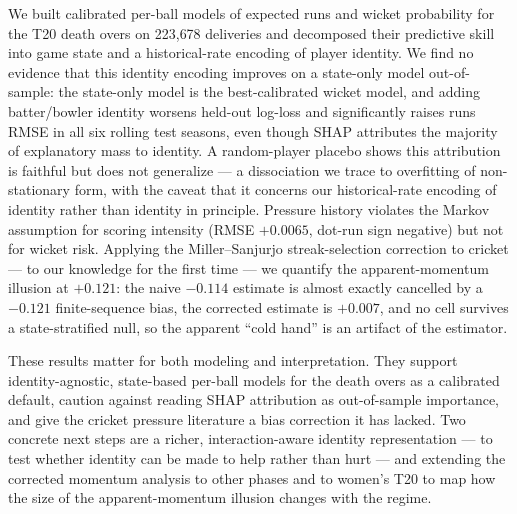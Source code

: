 We built calibrated per-ball models of expected runs and wicket probability for
the T20 death overs on 223{,}678 deliveries and decomposed their predictive skill
into game state and a historical-rate encoding of player identity. We find no
evidence that this identity encoding improves on a state-only model out-of-sample:
the state-only model is the best-calibrated wicket
model, and adding batter/bowler identity worsens held-out log-loss and significantly
raises runs RMSE in all six rolling test seasons, even though SHAP attributes the
majority of explanatory mass to identity. A random-player placebo shows this
attribution is faithful but does not generalize --- a dissociation we trace to
overfitting of non-stationary form, with the caveat that it concerns our
historical-rate encoding of identity rather than identity in principle. Pressure
history violates the Markov assumption for scoring intensity (RMSE $+0.0065$,
dot-run sign negative) but not for wicket risk. Applying the Miller--Sanjurjo
streak-selection correction to cricket --- to our knowledge for the first time ---
we quantify the apparent-momentum illusion at $+0.121$: the naive $-0.114$ estimate
is almost exactly cancelled by a $-0.121$ finite-sequence bias, the corrected
estimate is $+0.007$, and no cell survives a state-stratified null, so the apparent
``cold hand'' is an artifact of the estimator.

These results matter for both modeling and interpretation. They support
identity-agnostic, state-based per-ball models for the death overs as a calibrated
default, caution against reading SHAP attribution as out-of-sample importance, and
give the cricket pressure literature a bias correction it has lacked. Two concrete
next steps are a richer, interaction-aware identity representation --- to test
whether identity can be made to help rather than hurt --- and extending the
corrected momentum analysis to other phases and to women's T20 to map how the size
of the apparent-momentum illusion changes with the regime.
